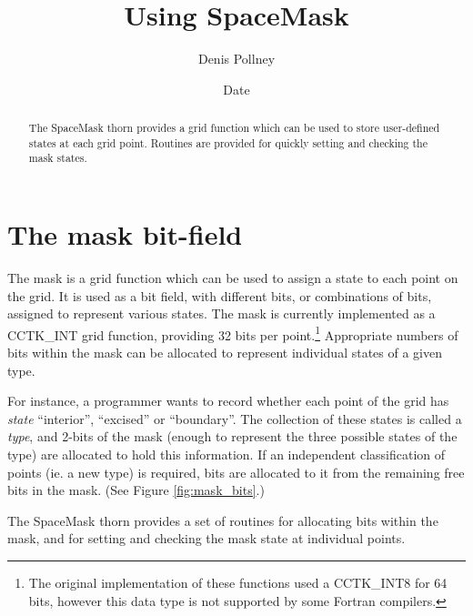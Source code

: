 \documentclass{article}
\begin{document}
\title{Using SpaceMask}
\author{Denis Pollney}
\date{$ $Date$ $}

\maketitle


\begin{abstract}
The SpaceMask thorn provides a grid function which can be used to
store user-defined states at each grid point. Routines are provided
for quickly setting and checking the mask states.
\end{abstract}

\section{The mask bit-field}

The mask is a grid function which can be used to assign a state to
each point on the grid. It is used as a bit field, with different
bits, or combinations of bits, assigned to represent various states.
The mask is currently implemented as a CCTK\_INT grid function,
providing 32 bits per point.\footnote{The original implementation of
these functions used a CCTK\_INT8 for 64 bits, however this data type
is not supported by some Fortran compilers.} Appropriate numbers of
bits within the mask can be allocated to represent individual states
of a given type.

For instance, a programmer wants to record whether each point of the
grid has \emph{state} ``interior'', ``excised'' or ``boundary''. The
collection of these states is called a \emph{type}, and 2-bits of the
mask (enough to represent the three possible states of the type) are
allocated to hold this information. If an independent classification
of points (ie. a new type) is required, bits are allocated to it from
the remaining free bits in the mask. (See Figure \ref{fig:mask_bits}.)

The SpaceMask thorn provides a set of routines for allocating bits
within the mask, and for setting and checking the mask state at
individual points.
\end{document}
